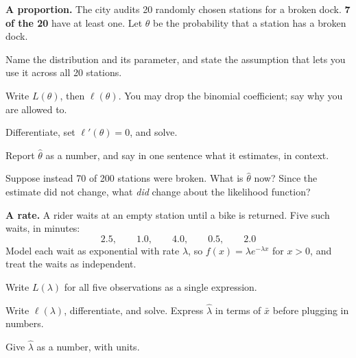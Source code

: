 \documentclass[11pt]{article}
\newcommand{\answerspace}[1]{\vspace{#1}}
\begin{document}
\begin{questions}

\item \textbf{A proportion.} The city audits 20 randomly chosen stations for a broken dock.
\textbf{7 of the 20} have at least one. Let $\theta$ be the probability that a station has a
broken dock.

\begin{parts}
\item Name the distribution and its parameter, and state the assumption that lets you use it
across all 20 stations.
\answerspace{3.5em}

\item Write $L(\theta)$, then $\ell(\theta)$. You may drop the binomial coefficient; say why you
are allowed to.
\answerspace{3.5em}

\item Differentiate, set $\ell'(\theta) = 0$, and solve.
\answerspace{3.5em}

\item Report $\hat\theta$ as a number, and say in one sentence what it estimates, in context.
\answerspace{3.5em}

\item Suppose instead 70 of 200 stations were broken. What is $\hat\theta$ now? Since the estimate
did not change, what \emph{did} change about the likelihood function?
\answerspace{3.5em}
\end{parts}

\item \textbf{A rate.} A rider waits at an empty station until a bike is returned. Five such
waits, in minutes:
\[
2.5, \qquad 1.0, \qquad 4.0, \qquad 0.5, \qquad 2.0
\]
Model each wait as exponential with rate $\lambda$, so $f(x) = \lambda e^{-\lambda x}$ for
$x > 0$, and treat the waits as independent.

\begin{parts}
\item Write $L(\lambda)$ for all five observations as a single expression.
\answerspace{3.5em}

\item Write $\ell(\lambda)$, differentiate, and solve. Express $\hat\lambda$ in terms of $\bar{x}$
before plugging in numbers.
\answerspace{3.5em}

\item Give $\hat\lambda$ as a number, with units.
\answerspace{3em}


\end{parts}
\end{questions}
\end{document}
